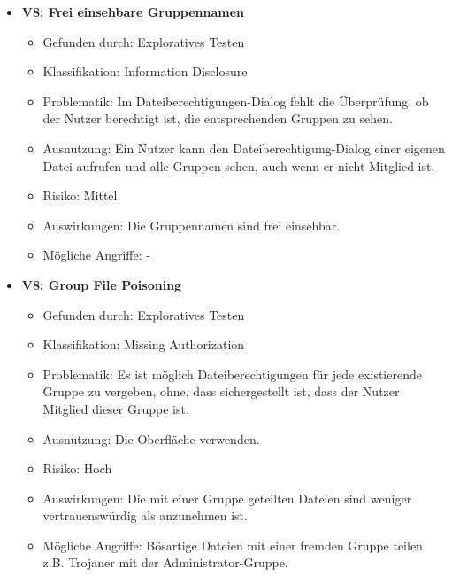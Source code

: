 \documentclass[12pt,DIV14,BCOR10mm,a4paper,parskip=half-,headsepline,headinclude,english,ngerman,bibliography=totocnumbered]{scrreprt}
\begin{document}
\begin{itemize}
  \hypertarget{vulnerability8}{}
  \item \textbf{V8: Frei einsehbare Gruppennamen}
  \begin{itemize}
  \item Gefunden durch: Exploratives Testen
  \item Klassifikation: Information Disclosure
  \item Problematik: Im Dateiberechtigungen-Dialog fehlt die Überprüfung, ob der Nutzer berechtigt ist, die entsprechenden Gruppen zu sehen.
  \item Ausnutzung: Ein Nutzer kann den Dateiberechtigung-Dialog einer eigenen Datei aufrufen und alle Gruppen sehen, auch wenn er nicht Mitglied ist.
  \item Risiko: Mittel
  \item Auswirkungen: Die Gruppennamen sind frei einsehbar.
  \item Mögliche Angriffe: -
  \end{itemize}
  
    \hypertarget{vulnerability8}{}
  \item \textbf{V8: Group File Poisoning}
  \begin{itemize}
  \item Gefunden durch: Exploratives Testen
  \item Klassifikation: Missing Authorization
  \item Problematik: Es ist möglich Dateiberechtigungen für jede existierende Gruppe zu vergeben, ohne, dass sichergestellt ist, dass der Nutzer Mitglied dieser Gruppe ist.
  \item Ausnutzung: Die Oberfläche verwenden.
  \item Risiko: Hoch
  \item Auswirkungen: Die mit einer Gruppe geteilten Dateien sind weniger vertrauenswürdig als anzunehmen ist.
  \item Mögliche Angriffe: Bösartige Dateien mit einer fremden Gruppe teilen z.B. Trojaner mit der Administrator-Gruppe.
  \end{itemize}


\end{itemize}
\end{document}
